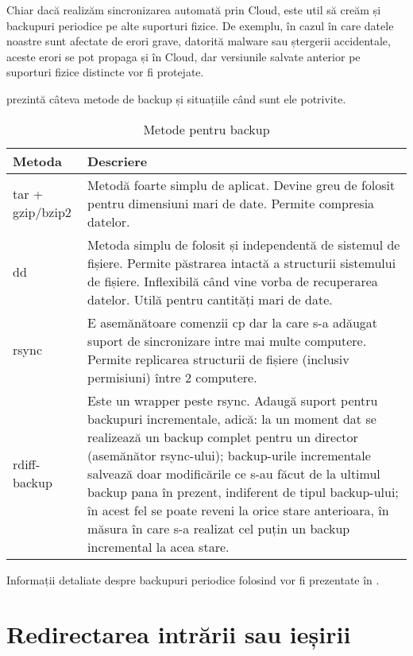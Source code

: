 Chiar dacă realizăm sincronizarea automată prin Cloud, este util să creăm și backupuri periodice pe alte suporturi fizice. De exemplu, în cazul în care datele noastre sunt afectate de erori grave, datorită malware sau ștergerii accidentale, aceste erori se pot propaga și în Cloud, dar versiunile salvate anterior pe suporturi fizice distincte vor fi protejate.

 prezintă câteva metode de backup și situațiile când sunt ele
potrivite.

\begin{table}[htb]
\caption{Metode pentru backup}
\begin{center}
  \begin{tabular}{ p{} p{} }
  \toprule
    \textbf{Metoda} & \textbf{Descriere} \\
  \midrule
    tar + gzip/bzip2 & Metodă foarte simplu de aplicat. Devine greu de folosit pentru dimensiuni mari de date. Permite compresia
    datelor. \\
  \midrule
    dd & Metoda simplu de folosit și independentă de sistemul de fișiere. Permite păstrarea intactă a structurii sistemului de fișiere. Inflexibilă când vine vorba de recuperarea datelor.  Utilă pentru cantități mari de date. \\
  \midrule
    rsync & E asemănătoare comenzii cp dar la care s-a adăugat suport de sincronizare intre mai multe computere. Permite replicarea structurii de fișiere (inclusiv permisiuni) între 2
    computere. \\
  \midrule
    rdiff-backup & Este un wrapper peste rsync. Adaugă suport pentru backupuri incrementale, adică: la un moment dat se realizează un backup complet pentru un director (asemănător rsync-ului); backup-urile incrementale salvează doar modificările ce s-au făcut de la ultimul backup pana în prezent, indiferent de tipul backup-ului; în acest fel se poate reveni la orice stare anterioara, în măsura în care s-a realizat cel puțin un backup incremental la acea stare. \\
  \bottomrule
  \end{tabular}
  \label{table:file-system-backup-cmd}
\end{center}
\end{table}

Informații detaliate despre backupuri periodice folosind  vor fi prezentate în .

\section{Redirectarea intrării sau ieșirii}
\label{sec:fs:redirect}

